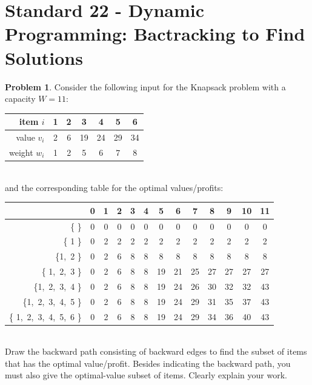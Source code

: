 \documentclass[11pt]{article}
\theoremstyle{definition}
\theoremstyle{definition}
\newtheorem{required}{Problem}
\theoremstyle{definition}
\begin{document}
\newpage
\section{Standard 22 - Dynamic Programming: Bactracking to Find Solutions}
\begin{required}
Consider the following input for the Knapsack problem with a capacity $W=11$:\\
\begin{center}
 \begin{tabular}{r|c|c|c|c|c|c}
        item $i$  & 1  & 2 &3 &4 &5 &6 \\
                \hline
        value $v_i$ &2 & 6& 19&24 &29 &34 \\
          \hline
        weight $w_i$ & 1 & 2  & 5& 6& 7& 8\\
                 \end{tabular}
\end{center}

\vspace{1mm}
\noindent \\ 
and the corresponding table for the optimal values/profits:\\
\begin{center}
 \begin{tabular}{r|c|c|c|c|c|c|c|c|c|c|c|c}
          & 0  & 1 &2 &3 &4&5&6&7&8&9&10&11 \\
                \hline
        \{  \}  &0 & 0& 0&0 &0 &0&0 & 0& 0&0 &0 &0 \\
          \hline
         \{ 1 \}  & 0 & 2  & 2& 2& 2& 2& 2  & 2& 2& 2& 2&2\\
          \hline
           \{1,~2  \}  & 0 & 2  & 6& 8& 8& 8& 8& 8& 8& 8& 8& 8\\
          \hline
           \{ 1,~2,~3 \}  & 0 & 2  & 6&8& 8& 19&21&25&27&27&27&27\\
          \hline
           \{1,~2,~3,~4  \}  & 0 & 2  & 6& 8& 8& 19&24&26&30&32&32&43\\
          \hline
           \{1,~2,~3,~4,~5  \}  & 0 & 2  & 6& 8& 8& 19&24&29&31&35&37&43\\
          \hline
           \{ 1,~2,~3,~4,~5,~6 \}  & 0 & 2  & 6& 8& 8& 19&24&29&34&36&40&43\\
          
          
                 \end{tabular}
\end{center}

\vspace{1mm}
\noindent \\ 
Draw the backward path consisting of backward edges to find the subset of items that has the optimal value/profit. Besides indicating the backward path, you must also give the optimal-value subset of items.
Clearly explain your work. 


\end{required}
\end{document}
